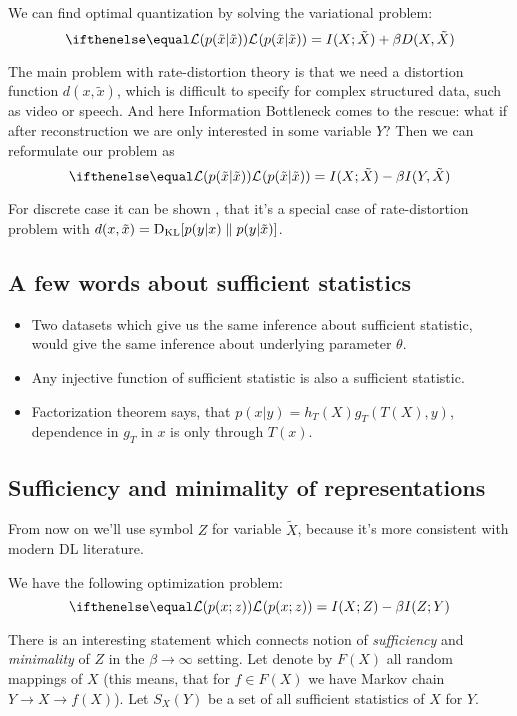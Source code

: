 \documentclass{article}
\begin{document}
We can find optimal quantization by solving the variational problem:
\[
\loss{p(\tilde{x} | \tilde{x})} = I(X; \tilde{X}) + \beta D(X, \tilde{X})
\]

The main problem with rate-distortion theory is that we need a distortion function $d(x, \tilde{x})$, which is difficult to specify for complex structured data, such as video or speech.
And here Information Bottleneck comes to the rescue: what if after reconstruction we are only interested in some variable $Y$?
Then we can reformulate our problem as
\[
\loss{p(\tilde{x} | \tilde{x})} = I(X; \tilde{X}) - \beta I(Y, \tilde{X})
\]

For discrete case it can be shown \cite{Information_Bottleneck}, that it's a special case of rate-distortion problem with $d(x, \tilde{x}) = \text{D}_\text{KL}[p(y|x) \parallel p(y|\tilde{x})]$.

\subsection{A few words about sufficient statistics}
\begin{itemize}
    \item Two datasets which give us the same inference about sufficient statistic, would give the same inference about underlying parameter $\theta$.
    \item Any injective function of sufficient statistic is also a sufficient statistic.
    \item Factorization theorem says, that $p(x|y) = h_T(X) g_T(T(X), y)$, dependence in $g_T$ in $x$ is only through $T(x)$.
\end{itemize}

\subsection{Sufficiency and minimality of representations}
From now on we'll use symbol $Z$ for variable $\tilde{X}$, because it's more consistent with modern DL literature.

We have the following optimization problem:
\[
\loss{p(x;z)} = I(X;Z) - \beta I(Z; Y)
\]

There is an interesting statement which connects notion of \textit{sufficiency} and \textit{minimality} of $Z$ in the $\beta \to \infty$ setting.
Let denote by $F(X)$ all random mappings of $X$ (this means, that for $f \in F(X)$ we have Markov chain $Y \to X \to f(X)$).
Let $S_X(Y)$ be a set of all sufficient statistics of $X$ for $Y$.
\end{document}
